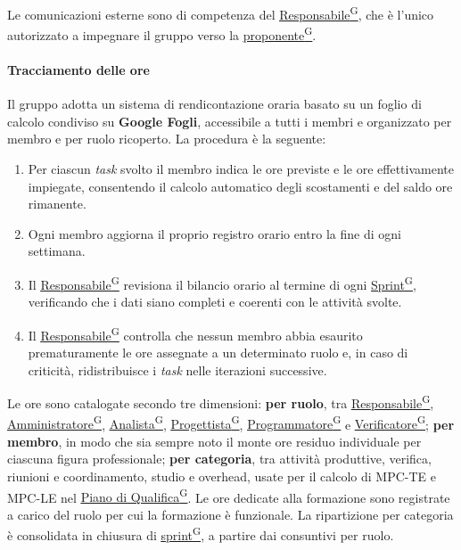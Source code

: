 \documentclass[a4paper,12pt]{article}
\providecommand{\glslink}[2]{\href{https://alittlebyte-19.github.io/Documentazione/glossario.html\#gls-#1}{\underline{#2}\textsuperscript{\scriptsize G}}}
\begin{document}
Le comunicazioni esterne sono di competenza del \glslink{responsabile}{Responsabile}, che è l'unico autorizzato a impegnare il gruppo verso la \glslink{committente-proponente}{proponente}.

\paragraph{Tracciamento delle ore}
Il gruppo adotta un sistema di rendicontazione oraria basato su un foglio di calcolo condiviso su \textbf{Google Fogli}, accessibile a tutti i membri e organizzato per membro e per ruolo ricoperto. La procedura è la seguente:

\begin{enumerate}
    \item Per ciascun \textit{task} svolto il membro indica le ore previste e le ore effettivamente impiegate, consentendo il calcolo automatico degli scostamenti e del saldo ore rimanente.
    \item Ogni membro aggiorna il proprio registro orario entro la fine di ogni settimana.
    \item Il \glslink{responsabile}{Responsabile} revisiona il bilancio orario al termine di ogni \glslink{sprint}{Sprint}, verificando che i dati siano completi e coerenti con le attività svolte.
    \item Il \glslink{responsabile}{Responsabile} controlla che nessun membro abbia esaurito prematuramente le ore assegnate a un determinato ruolo e, in caso di criticità, ridistribuisce i \textit{task} nelle iterazioni successive.
\end{enumerate}

Le ore sono catalogate secondo tre dimensioni: \textbf{per ruolo}, tra \glslink{responsabile}{Responsabile}, \glslink{amministratore}{Amministratore}, \glslink{analista}{Analista}, \glslink{progettista}{Progettista}, \glslink{programmatore}{Programmatore} e \glslink{verificatore}{Verificatore}; \textbf{per membro}, in modo che sia sempre noto il monte ore residuo individuale per ciascuna figura professionale; \textbf{per categoria}, tra attività produttive, verifica, riunioni e coordinamento, studio e overhead, usate per il calcolo di MPC-TE e MPC-LE nel \glslink{piano-di-qualifica}{Piano di Qualifica}. Le ore dedicate alla formazione sono registrate a carico del ruolo per cui la formazione è funzionale. La ripartizione per categoria è consolidata in chiusura di \glslink{sprint}{sprint}, a partire dai consuntivi per ruolo.
\end{document}
